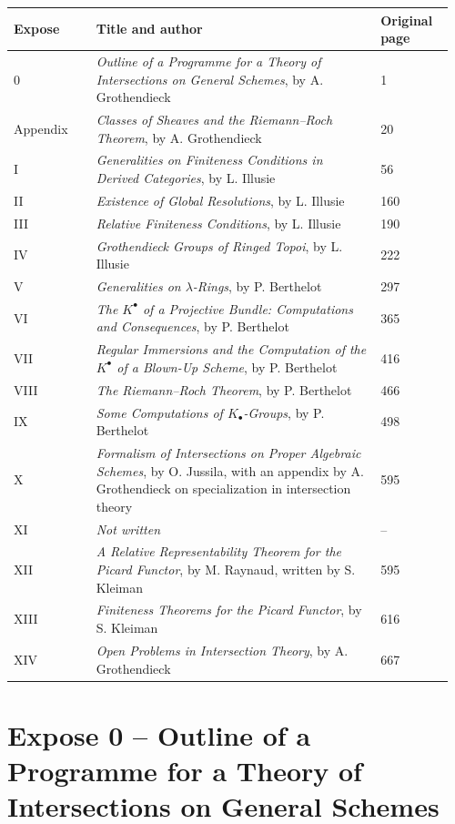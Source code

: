 \documentclass[14pt]{extarticle}
\begin{document}
\begin{longtable}{p{0.18\linewidth}p{0.62\linewidth}p{0.16\linewidth}}
\toprule
Expose & Title and author & Original page \\
\midrule
0 & \emph{Outline of a Programme for a Theory of Intersections on General Schemes}, by A. Grothendieck & 1 \\
Appendix & \emph{Classes of Sheaves and the Riemann--Roch Theorem}, by A. Grothendieck & 20 \\
I & \emph{Generalities on Finiteness Conditions in Derived Categories}, by L. Illusie & 56 \\
II & \emph{Existence of Global Resolutions}, by L. Illusie & 160 \\
III & \emph{Relative Finiteness Conditions}, by L. Illusie & 190 \\
IV & \emph{Grothendieck Groups of Ringed Topoi}, by L. Illusie & 222 \\
V & \emph{Generalities on $\lambda$-Rings}, by P. Berthelot & 297 \\
VI & \emph{The $K^{\bullet}$ of a Projective Bundle: Computations and Consequences}, by P. Berthelot & 365 \\
VII & \emph{Regular Immersions and the Computation of the $K^{\bullet}$ of a Blown-Up Scheme}, by P. Berthelot & 416 \\
VIII & \emph{The Riemann--Roch Theorem}, by P. Berthelot & 466 \\
IX & \emph{Some Computations of $K_{\bullet}$-Groups}, by P. Berthelot & 498 \\
X & \emph{Formalism of Intersections on Proper Algebraic Schemes}, by O. Jussila, with an appendix by A. Grothendieck on specialization in intersection theory & 595 \\
XI & \emph{Not written} & -- \\
XII & \emph{A Relative Representability Theorem for the Picard Functor}, by M. Raynaud, written by S. Kleiman & 595 \\
XIII & \emph{Finiteness Theorems for the Picard Functor}, by S. Kleiman & 616 \\
XIV & \emph{Open Problems in Intersection Theory}, by A. Grothendieck & 667 \\
\bottomrule
\end{longtable}

\newpage

\section{Expose 0 -- Outline of a Programme for a Theory of Intersections on General Schemes}
\end{document}
